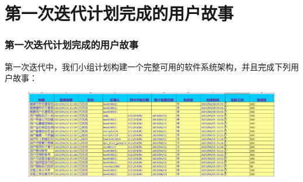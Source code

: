 \section{第一次迭代计划完成的用户故事}
\begin{frame}
    \frametitle{第一次迭代计划完成的用户故事}
    第一次迭代中，我们小组计划构建一个完整可用的软件系统架构，并且完成下列用户故事：
    \begin{figure}[H]
        \centering
        \includegraphics[width=\textwidth]{contents/figure/iteration1_stories.png}
    \end{figure}
\end{frame}
